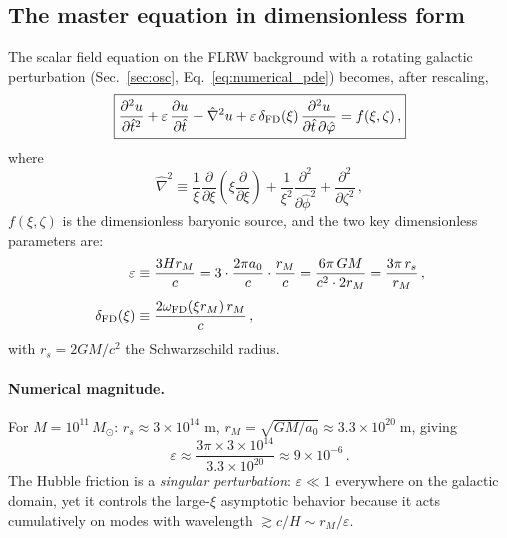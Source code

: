 \documentclass[11pt]{article}
\begin{document}
\subsection{The master equation in dimensionless form}
\label{sec:master_eq}

The scalar field equation on the FLRW background with a
rotating galactic perturbation (Sec.~\ref{sec:osc},
Eq.~\eqref{eq:numerical_pde}) becomes, after rescaling,
\begin{equation}
\boxed{
\frac{\partial^{2}u}{\partial \hat t^{2}}
+ \varepsilon\,\frac{\partial u}{\partial \hat t}
- \hat\nabla^{2}u
+ \varepsilon\,\delta_{\rm FD}(\xi)\,
  \frac{\partial^{2}u}{\partial \hat t\,\partial\hat\phi}
= f(\xi,\zeta)\,,
}
\label{eq:master}
\end{equation}
where
\begin{equation}
\hat\nabla^{2} \equiv
 \frac{1}{\xi}\frac{\partial}{\partial\xi}
 \!\left(\xi\frac{\partial}{\partial\xi}\right)
 + \frac{1}{\xi^{2}}\frac{\partial^{2}}{\partial\hat\phi^{2}}
 + \frac{\partial^{2}}{\partial\zeta^{2}}\,,
\label{eq:dimless_laplacian}
\end{equation}
$f(\xi,\zeta)$ is the dimensionless baryonic source, and
the two key dimensionless parameters are:
\begin{align}
\varepsilon &\equiv \frac{3Hr_M}{c}
 = 3\cdot\frac{2\pi a_0}{c}\cdot\frac{r_M}{c}
 = \frac{6\pi\,GM}{c^{2}\cdot 2r_M}
 = \frac{3\pi\,r_s}{r_M}\,,
\label{eq:epsilon}
\\[4pt]
\delta_{\rm FD}(\xi) &\equiv
 \frac{2\omega_{\rm FD}(\xi r_M)\,r_M}{c}\,,
\label{eq:delta_FD}
\end{align}
with $r_s = 2GM/c^{2}$ the Schwarzschild radius.

\paragraph{Numerical magnitude.}
For $M = 10^{11}\,M_\odot$:
$r_s \approx 3\times10^{14}\;\mathrm{m}$,
$r_M = \sqrt{GM/a_0} \approx 3.3\times10^{20}\;\mathrm{m}$, giving
\begin{equation}
\varepsilon \approx \frac{3\pi\times 3\times10^{14}}
  {3.3\times10^{20}}
\approx 9\times10^{-6}\,.
\label{eq:epsilon_value}
\end{equation}
The Hubble friction is a \emph{singular perturbation}:
$\varepsilon\ll 1$ everywhere on the galactic domain,
yet it controls the large-$\xi$ asymptotic behavior
because it acts cumulatively on modes with
wavelength $\gtrsim c/H \sim r_M/\varepsilon$.
\end{document}

